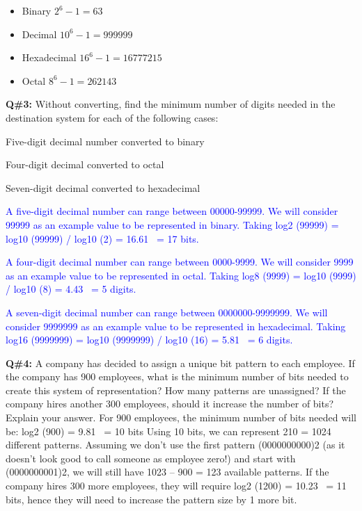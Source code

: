\begin{itemize}
    \item[(a)] Binary \quad $2^6 - 1 = 63$
    \item[(b)] Decimal \quad $10^6 - 1 = 999999$
    \item[(c)] Hexadecimal \quad $16^6 - 1 = 16777215$
    \item[(d)] Octal \quad $8^6 - 1 = 262143$
\end{itemize}
\textbf{Q\#3:} Without converting, find the minimum number of digits needed in the destination system for each of the following cases:
\begin{itemize}
    \item[a)] Five-digit decimal number converted to binary
    \item[b)] Four-digit decimal converted to octal
    \item[c)] Seven-digit decimal converted to hexadecimal
    \newline
    \textcolor{blue}{
    \item[a)] A five-digit decimal number can range between 00000-99999. We will consider 99999 as an example
value to be represented in binary. Taking log2 (99999) = log10 (99999) / log10 (2) = 16.61 ~= 17 bits.
    \item[b)] A four-digit decimal number can range between 0000-9999. We will consider 9999 as an example
value to be represented in octal. Taking log8 (9999) = log10 (9999) / log10 (8) = 4.43 ~= 5 digits.
    \item[c)] A seven-digit decimal number can range between 0000000-9999999. We will consider 9999999 as
an example value to be represented in hexadecimal.
Taking log16 (9999999) = log10 (9999999) / log10 (16) = 5.81 ~= 6 digits.
    }
\end{itemize}

\textbf{Q\#4:} A company has decided to assign a unique bit pattern to each employee. If the company has 900
employees, what is the minimum number of bits needed to create this system of representation? How
many patterns are unassigned? If the company hires another 300 employees, should it increase the
number of bits? Explain your answer.
\newline
For 900 employees, the minimum number of bits needed will be: log2 (900) = 9.81 ~= 10 bits
Using 10 bits, we can represent 210 = 1024 different patterns. Assuming we don’t use the first pattern
(0000000000)2 (as it doesn’t look good to call someone as employee zero!) and start with
(0000000001)2, we will still have 1023 – 900 = 123 available patterns.
If the company hires 300 more employees, they will require log2 (1200) = 10.23 ~= 11 bits, hence they
will need to increase the pattern size by 1 more bit.

